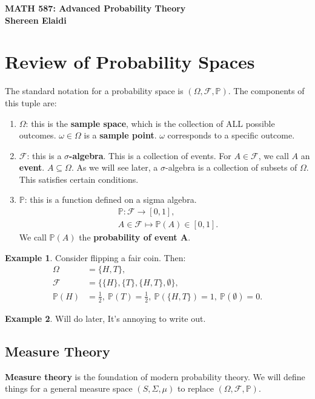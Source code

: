 \documentclass[11pt]{article}
\theoremstyle{definition}
\newtheorem{ex}{Example}[section]
\theoremstyle{theorem}
\newcommand{\prob}[1]{\mathbb{P}\left(#1 \right)}
\begin{document}
\begin{center}
	\textbf{MATH 587: Advanced Probability Theory} \\
	\textbf{Shereen Elaidi}
\end{center}

\section{Review of Probability Spaces}
The standard notation for a probability space is \( ( \Omega, \mathcal{F}, \mathbb{P} ) \). The components of this tuple are: 
\begin{enumerate}[noitemsep]
	\item \( \Omega \): this is the \textbf{sample space}, which is the collection of ALL possible outcomes. \( \omega \in \Omega \) is a \textbf{sample point}. \( \omega \) corresponds to a specific outcome.
	\item \( \mathcal{F} \): this is a \textbf{ \( \sigma \)-algebra}. This is a collection of events. For \( A \in \mathcal{F} \), we call \( A \) an \textbf{event}. \( A \subseteq \Omega \). As we will see later, a \( \sigma \)-algebra is a collection of subsets of \( \Omega \). This satisfies certain conditions. 
	\item \( \mathbb{P} \): this is a function defined on a sigma algebra. 
	\begin{align*}
		& \mathbb{P}: \mathcal{F} \rightarrow [0,1],\\
		& A \in \mathcal{F} \mapsto \mathbb{P}(A) \in [0,1].
	\end{align*}
	We call \( \prob{A} \) the \textbf{probability of event A}.
\end{enumerate}

\begin{ex}
	Consider flipping a fair coin. Then: 
	\begin{align*} 
		\Omega & = \{ H, T \},  \\
		\mathcal{F} & = \{ \{ H \}, \{ T \}, \{ H, T \}, \emptyset \}, \\
		\prob{H} & = \frac{1}{2},\ \prob{T} = \frac{1}{2},\ \prob{ \{H, T \}} = 1,\ \prob{ \emptyset } = 0.
	\end{align*} 
\end{ex}

\begin{ex}
	Will do later, It's annoying to write out. 
\end{ex}

\subsection{Measure Theory}
\textbf{Measure theory} is the foundation of modern probability theory. We will define things for a general measure space \( (S, \Sigma, \mu ) \) to replace \( ( \Omega, \mathcal{F}, \mathbb{P} ) \). 
\end{document}
